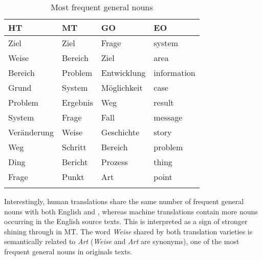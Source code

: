 \documentclass[output=paper]{langsci/langscibook.cls}
\begin{document}
\renewcommand{\colorone}{lsMidDarkBlue}
\renewcommand{\colortwo}{lsDarkGreen1}
\renewcommand{\colorthree}{lsLightGreen}
\renewcommand{\colorfour}{lsLightBlue}
\begin{table}
\begin{tabularx}{\textwidth}{XXXX}
\lsptoprule
\bf HT & \bf MT & \bf GO & \bf EO \\
\midrule
{\cellcolor{\colorone}Ziel} &{\cellcolor{\colorone} Ziel} & {\cellcolor{\colorone}Frage} & {\cellcolor{\colorfour}system} \\
{\cellcolor{\colortwo}Weise} & {\cellcolor{\colorthree}Bereich} & {\cellcolor{\colorone}Ziel} & {\cellcolor{\colorthree}area} \\
{\cellcolor{\colorthree}Bereich} & {\cellcolor{\colorfour}Problem} & Entwicklung & information \\ 
Grund & {\cellcolor{\colorfour}System} & M\"oglichkeit & {\cellcolor{\colorthree}case} \\
{\cellcolor{\colorfour}Problem} & {\cellcolor{\colorfour}Ergebnis} & {\cellcolor{\colorone}Weg} & {\cellcolor{\colorfour}result} \\
{\cellcolor{\colorfour}System} & {\cellcolor{\colorone}Frage} & {\cellcolor{\colorthree}Fall} & message \\
Ver\"anderung & {\cellcolor{\colortwo}Weise} & {\cellcolor{\colorthree}Geschichte} & {\cellcolor{\colorthree}story} \\
{\cellcolor{\colorone}Weg} & Schritt & {\cellcolor{\colorthree}Bereich} & {\cellcolor{\colorfour}problem} \\
{\cellcolor{\colorfour}Ding} & Bericht & Prozess & {\cellcolor{\colorfour}thing} \\
{\cellcolor{\colorone}Frage} & {\cellcolor{\colorfour}Punkt} & Art & {\cellcolor{\colorfour}point} \\
\lspbottomrule
\end{tabularx}
\caption{Most frequent general nouns}
\label{table:gennoun}
\end{table}

Interestingly, human translations share the same number of frequent general nouns with both English and , whereas machine translations contain more nouns occurring in the English source texts. This is interpreted as a sign of stronger shining through in MT. The word  \textsl{Weise} shared by both translation varieties is semantically related to  \textsl{Art} (\textsl{Weise} and  \textsl{Art} are synonyms), one of the most frequent general nouns in  originals texts.
\end{document}
